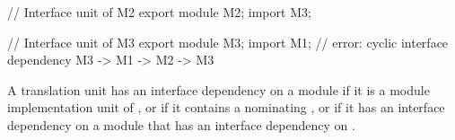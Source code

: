 \begin{std.txt}
\begin{example}
\begin{Program}
     // Interface unit of M2
     export module M2;
     import M3;

     // Interface unit of M3
     export module M3;
     import M1;         // error: cyclic interface dependency M3 -> M1 -> M2 -> M3
  \end{Program}
  \end{example}

\begin{before}\color{addclr}
\alinea
  A translation unit has an interface dependency on a module  if it is
  a module implementation unit of , or if it contains a
   nominating , or if it has
  an interface dependency on a module that has an interface dependency on .
\end{before}
\end{std.txt}

